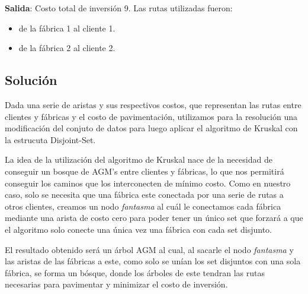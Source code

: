 \documentclass[a4paper, 10pt, twoside]{article}
\begin{document}
\textbf{Salida}: Costo total de inversión 9. Las rutas utilizadas fueron:
\begin{itemize}
\item{de la fábrica 1 al cliente 1.}
\item{de la fábrica 2 al cliente 2.}
\end{itemize}


\subsection{Solución}

Dada una serie de aristas y sus respectivos costos, que representan las rutas entre clientes y fábricas y el costo de pavimentación, utilizamos para la resolución una modificación del conjuto de datos para luego aplicar el algoritmo de Kruskal con la estrucuta Disjoint-Set.

La idea de la utilización del algoritmo de Kruskal nace de la necesidad de conseguir un bosque de AGM's entre clientes y fábricas, lo que nos permitirá conseguir los caminos que los interconecten de mínimo costo. Como en nuestro caso, solo se necesita que una fábrica este conectada por una serie de rutas a otros clientes, creamos un nodo \textit{fantasma} al cuál le conectamos cada fábrica mediante una arista de costo cero para poder tener un único set que forzará a que el algoritmo solo conecte una única vez una fábrica con cada set disjunto.

El resultado obtenido será un árbol AGM al cual, al sacarle el nodo \textit{fantasma} y las aristas de las fábricas a este, como solo se unían los set disjuntos con una sola fábrica, se forma un bósque, donde los árboles de este tendran las rutas necesarias para pavimentar y minimizar el costo de inversión.
\end{document}
